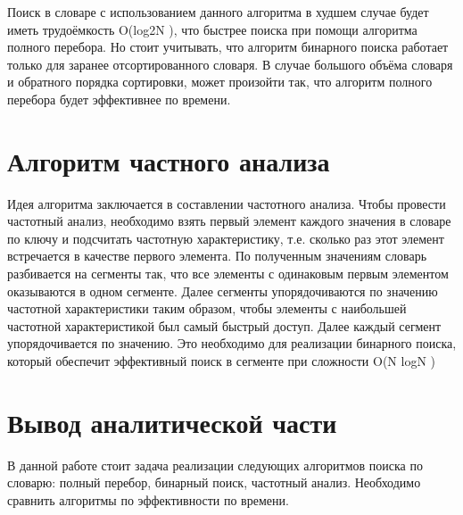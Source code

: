 Поиск в словаре с использованием данного алгоритма в худшем случае будет иметь трудоёмкость O(log2N ), что быстрее поиска при помощи
алгоритма полного перебора. Но стоит учитывать, что алгоритм бинарного
поиска работает только для заранее отсортированного словаря.
В случае большого объёма словаря и обратного порядка сортировки,
может произойти так, что алгоритм полного перебора будет эффективнее по
времени.

\section{Алгоритм частного анализа}\label{ChoiseSort}

Идея алгоритма заключается в составлении частотного анализа. Чтобы провести частотный анализ, 
необходимо взять первый элемент каждого
значения в словаре по ключу и подсчитать частотную характеристику, т.е.
сколько раз этот элемент встречается в качестве первого элемента. По полученным значениям словарь 
разбивается на сегменты так, что все элементы с одинаковым первым элементом оказываются в одном сегменте.
Далее сегменты упорядочиваются по значению частотной характеристики таким образом, чтобы элементы с наибольшей частотной
характеристикой был самый быстрый доступ.
Далее каждый сегмент упорядочивается по значению. Это необходимо
для реализации бинарного поиска, который обеспечит эффективный поиск в
сегменте при сложности O(N logN )

\section{Вывод аналитической части}\label{End_analis_chapter}

В данной работе стоит задача реализации следующих алгоритмов поиска по словарю: полный перебор, бинарный поиск, частотный анализ. 
Необходимо сравнить алгоритмы по эффективности по времени.
 
